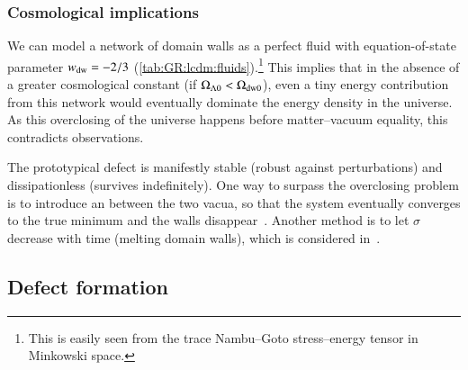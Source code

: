     \subsubsection{Cosmological implications}
        We can model a network of domain walls as a perfect fluid with equation-of-state parameter $w_\mathrm{dw}= -2/3$ (\cref{tab:GR:lcdm:fluids}).\footnote{This is easily seen from the trace Nambu--Goto stress--energy tensor in Minkowski space.} This implies that in the absence of a greater cosmological constant (if $\Omega_{\Lambda 0} < \Omega_\mathrm{dw0}$), 
        even a tiny energy contribution from this network would eventually dominate the energy density in the universe. As this overclosing of the universe happens before matter--vacuum equality, this contradicts observations.

        The prototypical defect is manifestly stable (robust against perturbations) and dissipationless (survives indefinitely). One way to surpass the overclosing problem is to introduce an  between the two vacua, so that the system eventually converges to the true minimum and the walls disappear~\citep{saikawaReviewGravitationalWaves2017}. Another method is to let $\sigma$ decrease with time (melting domain walls), which is considered in~\citet{babichevNANOGravSpectralIndex2023}.


















\subsection{Defect formation}\label{sec:cosmo:defects:formation}

